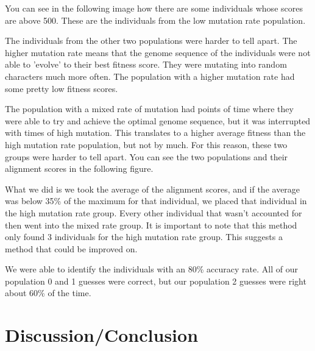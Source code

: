 \documentclass[a4paper, 12pt, one column]{article}
\begin{document}
\begin{multicols}{2}
You can see in the following image how there are some individuals whose scores are above 500. These are the individuals from the low mutation rate population. 


The individuals from the other two populations were harder to tell apart. The higher mutation rate means that the genome sequence of the individuals were not able to 'evolve' to their best fitness score. They were mutating into random characters much more often. The population with a higher mutation rate had some pretty low fitness scores. 

The population with a mixed rate of mutation had points of time where they were able to try and achieve the optimal genome sequence, but it was interrupted with times of high mutation. This translates to a higher average fitness than the high mutation rate population, but not by much. For this reason, these two groups were harder to tell apart. You can see the two populations and their alignment scores in the following figure.


What we did is we took the average of the alignment scores, and if the average was below 35\% of the maximum for that individual, we placed that individual in the high mutation rate group. Every other individual that wasn't accounted for then went into the mixed rate group. It is important to note that this method only found 3 individuals for the high mutation rate group. This suggests a method that could be improved on.

We were able to identify the individuals with an 80\% accuracy rate. All of our population 0 and 1 guesses were correct, but our population 2 guesses were right about 60\% of the time. 

\section{Discussion/Conclusion}

\end{multicols}
\end{document}
